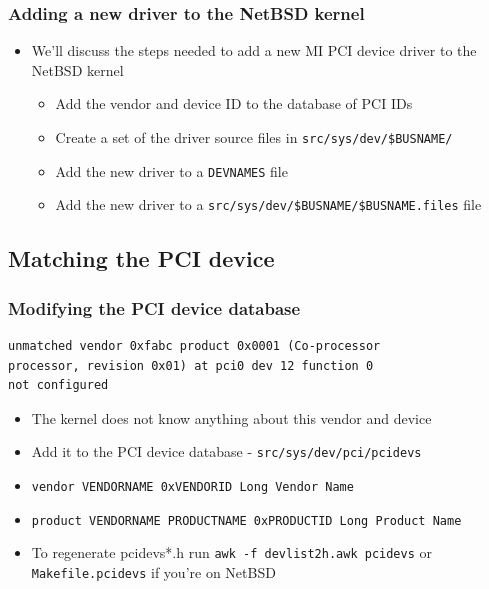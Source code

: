 \documentclass[dvipsnames,table]{beamer}
\begin{document}
\begin{frame}
\frametitle{Adding a new driver to the NetBSD kernel}
\begin{itemize}
	\item We'll discuss the steps needed to add a new MI PCI device driver to the NetBSD kernel
	\begin{itemize}
		\item Add the vendor and device ID to the database of PCI IDs
		\item Create a set of the driver source files in {\tt src/sys/dev/\$BUSNAME/ }
		\item Add the new driver to a {\tt DEVNAMES} file
		\item Add the new driver to a {\tt src/sys/dev/\$BUSNAME/\$BUSNAME.files} file
	\end{itemize}
\end{itemize}
\end{frame}

\subsection{Matching the PCI device}

\begin{frame}[fragile]
\frametitle{Modifying the PCI device database}
\begin{verbatim}
unmatched vendor 0xfabc product 0x0001 (Co-processor 
processor, revision 0x01) at pci0 dev 12 function 0 
not configured
\end{verbatim}
\begin{itemize}
	\item The kernel does not know anything about this vendor and device
	\item Add it to the PCI device database - {\tt src/sys/dev/pci/pcidevs}
	\item {\tt vendor VENDORNAME 0xVENDORID Long Vendor Name}
	\item {\tt product VENDORNAME PRODUCTNAME 0xPRODUCTID	Long Product Name}
	\item To regenerate pcidevs*.h run {\tt awk -f devlist2h.awk pcidevs} or
{\tt Makefile.pcidevs} if you're on NetBSD
\end{itemize}
\end{frame}
\end{document}
